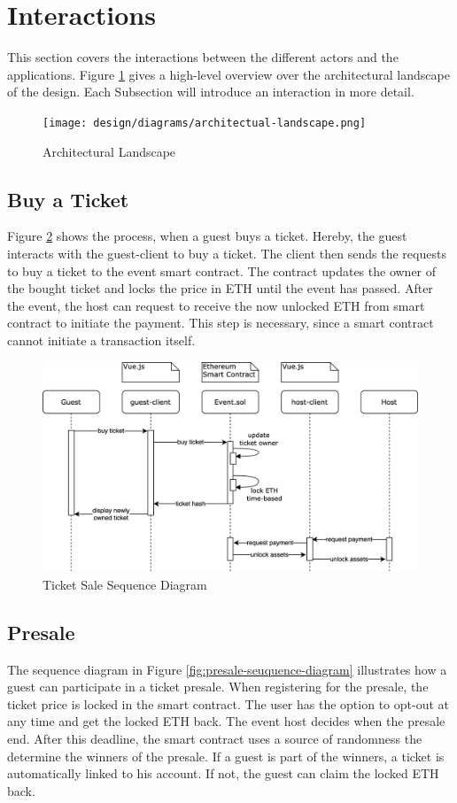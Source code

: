 \section{Interactions}
This section covers the interactions between the different actors and the applications. Figure \ref{fig:architecture} gives a high-level overview over the architectural landscape of the design. Each Subsection will introduce an interaction in more detail.

\begin{figure}[H]
    \centering
    \texttt{[image: design/diagrams/architectual-landscape.png]}
    \caption{Architectural Landscape}
    \label{fig:architecture}
\end{figure}

\subsection{Buy a Ticket}
Figure \ref{fig:buyticket-sequence-diagram} shows the process, when a guest buys a ticket. Hereby, the guest interacts with the guest-client to buy a ticket. The client then sends the requests to buy a ticket to the event smart contract. The contract updates the owner of the bought ticket and locks the price in ETH until the event has passed. After the event, the host can request to receive the now unlocked ETH from smart contract to initiate the payment. This step is necessary, since a smart contract cannot initiate a transaction itself.
\begin{figure}[H]
    \centering
    \includegraphics[width=16cm]{design/diagrams/BuyTicket.png}
    \caption{Ticket Sale Sequence Diagram}
    \label{fig:buyticket-sequence-diagram}
\end{figure}

\subsection{Presale}
The sequence diagram in Figure \ref{fig:presale-seuquence-diagram} illustrates how a guest can participate in a ticket presale. When registering for the presale, the ticket price is locked in the smart contract. The user has the option to opt-out at any time and get the locked ETH back. The event host decides when the presale end. After this deadline, the smart contract uses a source of randomness the determine the winners of the presale. If a guest is part of the winners, a ticket is automatically linked to his account. If not, the guest can claim the locked ETH back.

